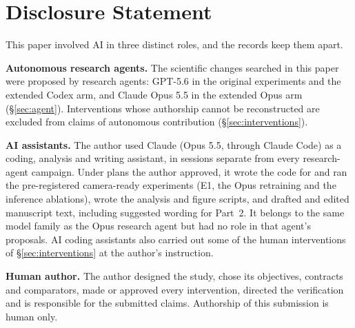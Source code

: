\documentclass{article}
\newif\ifshowhumanmarkers \showhumanmarkersfalse
\newcommand{\humantag}[1]{{\color{humanframe}\sffamily\scriptsize\bfseries HUMAN AUTHOR MUST REWRITE/VERIFY [#1]}\ }
\newcommand{\humanauthor}[2][]{\ifshowhumanmarkers\begin{humanbox}\humantag{#1}#2\end{humanbox}\else #2\par\fi}
\begin{document}
\section{Disclosure Statement}
\humanauthor[Disclosure r6]{This paper involved AI in three distinct roles, and the records keep them apart.

\textbf{Autonomous research agents.} The scientific changes searched in this paper were proposed by research agents: GPT-5.6 in the original experiments and the extended Codex arm, and Claude Opus 5.5 in the extended Opus arm (\S\ref{sec:agent}). Interventions whose authorship cannot be reconstructed are excluded from claims of autonomous contribution (\S\ref{sec:interventions}).

\textbf{AI assistants.} The author used Claude (Opus 5.5, through Claude Code) as a coding, analysis and writing assistant, in sessions separate from every research-agent campaign. Under plans the author approved, it wrote the code for and ran the pre-registered camera-ready experiments (E1, the Opus retraining and the inference ablations), wrote the analysis and figure scripts, and drafted and edited manuscript text, including suggested wording for Part~2. It belongs to the same model family as the Opus research agent but had no role in that agent's proposals. AI coding assistants also carried out some of the human interventions of \S\ref{sec:interventions} at the author's instruction.

\textbf{Human author.} The author designed the study, chose its objectives, contracts and comparators, made or approved every intervention, directed the verification and is responsible for the submitted claims. Authorship of this submission is human only.}

\clearpage


\end{document}
